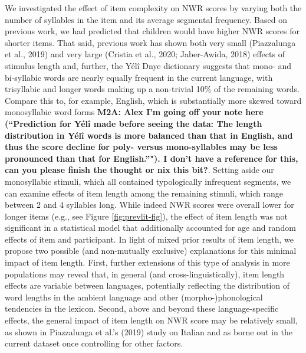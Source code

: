 \documentclass[english,,man,floatsintext]{apa6}
\begin{document}
We investigated the effect of item complexity on NWR scores by varying both the number of syllables in the item and its average segmental frequency. Based on previous work, we had predicted that children would have higher NWR scores for shorter items. That said, previous work has shown both very small (Piazzalunga et al., 2019) and very large (Cristia et al., 2020; Jaber-Awida, 2018) effects of stimulus length and, further, the Yélî Dnye dictionary suggests that mono- and bi-syllabic words are nearly equally frequent in the current language, with trisyllabic and longer words making up a non-trivial 10\% of the remaining words. Compare this to, for example, English, which is substantially more skewed toward monosyllabic word forms \textbf{M2A: Alex I'm going off your note here (\enquote{Prediction for Yélî made before seeing the data: The length distribution in Yélî words is more balanced than that in English, and thus the score decline for poly- versus mono-syllables may be less pronounced than that for English.}"). I don't have a reference for this, can you please finish the thought or nix this bit?}. Setting aside our monosyllabic stimuli, which all contained typologically infrequent segments, we can examine effects of item length among the remaining stimuli, which range between 2 and 4 syllables long. While indeed NWR scores were overall lower for longer items (e.g., see Figure \ref{fig:prevlit-fig}), the effect of item length was not significant in a statistical model that additionally accounted for age and random effects of item and participant. In light of mixed prior results of item length, we propose two possible (and non-mutually exclusive) explanations for this minimal impact of item length. First, further extensions of this type of analysis in more populations may reveal that, in general (and cross-linguistically), item length effects are variable between languages, potentially reflecting the distribution of word lengths in the ambient language and other (morpho-)phonological tendencies in the lexicon. Second, above and beyond these language-specific effects, the general impact of item length on NWR score may be relatively small, as shown in Piazzalunga et al.'s (2019) study on Italian and as borne out in the current dataset once controlling for other factors.
\end{document}
